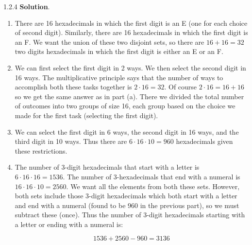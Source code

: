 \documentclass[11pt,]{book}
\theoremstyle{ptxplainnotitle}
\theoremstyle{ptxplaintitle}
\theoremstyle{ptxdefinitionnotitle}
\theoremstyle{ptxdefinitiontitle}
\theoremstyle{ptxdefinitionnotitle}
\theoremstyle{ptxdefinitiontitle}
\theoremstyle{ptxdefinitionnotitle}
\theoremstyle{ptxdefinitiontitle}
\theoremstyle{ptxdefinitiontitlenonumber}
\theoremstyle{ptxdefinitiontitlenonumber}
\numberwithin{equation}{chapter}
\begin{document}
\begin{divisionexercise}{1.2.4}
\textbf{Solution}.\quad%
\hypertarget{p-1154}{}%
\leavevmode%
\begin{enumerate}[label=\alph*.]
\item\hypertarget{li-497}{}\hypertarget{p-1155}{}%
There are 16 hexadecimals in which the first digit is an E (one for each choice of second digit). Similarly, there are 16 hexadecimals in which the first digit is an F. We want the union of these two disjoint sets, so there are \(16 + 16 = 32\) two digits hexadecimals in which the first digit is either an E or an F.%
\item\hypertarget{li-498}{}\hypertarget{p-1156}{}%
We can first select the first digit in 2 ways. We then select the second digit in 16 ways. The multiplicative principle says that the number of ways to accomplish both these tasks together is \(2 \cdot 16 = 32\text{.}\) Of course \(2 \cdot 16 = 16 + 16\) so we get the same answer as in part (a). There we divided the total number of outcomes into two groups of size 16, each group based on the choice we made for the first task (selecting the first digit).%
\item\hypertarget{li-499}{}\hypertarget{p-1157}{}%
We can select the first digit in 6 ways, the second digit in 16 ways, and the third digit in 10 ways. Thus there are \(6\cdot 16 \cdot 10 = 960\) hexadecimals given these restrictions.%
\item\hypertarget{li-500}{}\hypertarget{p-1158}{}%
The number of 3-digit hexadecimals that start with a letter is \(6 \cdot 16 \cdot 16 = 1536\text{.}\) The number of 3-hexadecimals that end with a numeral is \(16 \cdot 16 \cdot 10 = 2560\text{.}\) We want all the elements from both these sets. However, both sets include those 3-digit hexadecimals which both start with a letter and end with a numeral (found to be 960 in the previous part), so we must subtract these (once). Thus the number of 3-digit hexadecimals starting with a letter or ending with a numeral is:%
\par
\hypertarget{p-1159}{}%
%
\begin{equation*}
1536 + 2560 - 960 = 3136
\end{equation*}
%
\end{enumerate}
%
\end{divisionexercise}%
\end{document}
